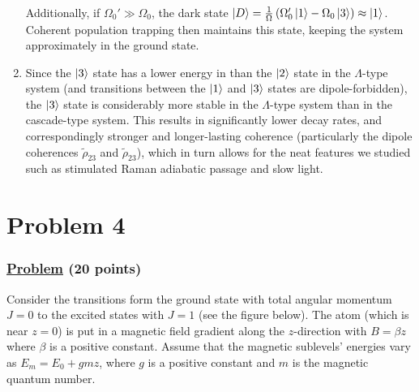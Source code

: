 \documentclass[12pt]{article}
\begin{document}
\begin{enumerate}[label=(\alph*)]
    Additionally, if $\Omega_0' \gg \Omega_0$, the dark state $\ket{D} = \frac{1}{\Omega}\left(\Omega_0'\ket{1} - \Omega_0\ket{3}\right) \approx \ket{1}$. Coherent population trapping then maintains this state, keeping the system approximately in the ground state.
    \item Since the $\ket{3}$ state has a lower energy in than the $\ket{2}$ state in the $\Lambda$-type system (and transitions between the $\ket{1}$ and $\ket{3}$ states are dipole-forbidden), the $\ket{3}$ state is considerably more stable in the $\Lambda$-type system than in the cascade-type system.
    This results in significantly lower decay rates, and correspondingly stronger and longer-lasting coherence (particularly the dipole coherences $\tilde{\rho}_{23}$ and $\tilde{\rho}_{23}$), which in turn allows for the neat features we studied such as stimulated Raman adiabatic passage and slow light.
\end{enumerate}


\section*{Problem 4}
\subsubsection*{\underline{Problem} (20 points)}
Consider the transitions form the ground state with total angular momentum $J=0$ to the excited states with $J=1$ (see the figure below). The atom (which is near $z=0$) is put in a magnetic field gradient along the $z$-direction with $B=\beta z$ where $\beta$ is a positive constant. 
Assume that the magnetic sublevels' energies vary as $E_m = E_0 + gmz$, where $g$ is a positive constant and $m$ is the magnetic quantum number.
\end{document}
